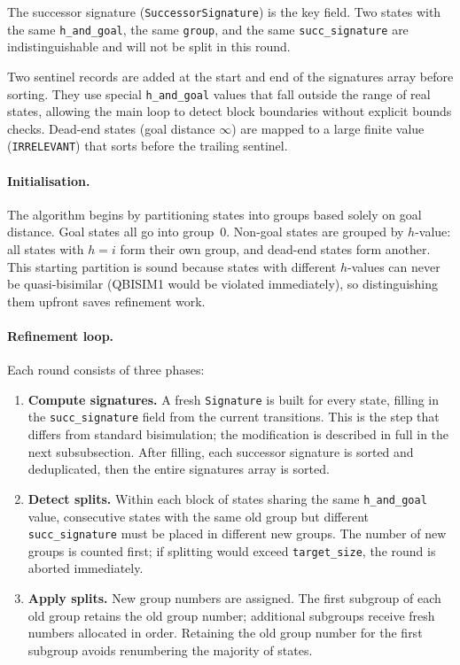 \documentclass[11pt,a4paper]{article}
\begin{document}
The successor signature (\texttt{SuccessorSignature}) is the key field.  Two
states with the same \texttt{h\_and\_goal}, the same \texttt{group}, and the
same \texttt{succ\_signature} are indistinguishable and will not be split in
this round.

Two sentinel records are added at the start and end of the signatures array
before sorting.  They use special \texttt{h\_and\_goal} values that fall
outside the range of real states, allowing the main loop to detect block
boundaries without explicit bounds checks.  Dead-end states (goal distance
$\infty$) are mapped to a large finite value (\texttt{IRRELEVANT}) that sorts
before the trailing sentinel.

\paragraph{Initialisation.}
The algorithm begins by partitioning states into groups based solely on goal
distance.  Goal states all go into group~0.  Non-goal states are grouped by
$h$-value: all states with $h = i$ form their own group, and dead-end states
form another.  This starting partition is sound because states with different
$h$-values can never be quasi-bisimilar (QBISIM1 would be violated immediately),
so distinguishing them upfront saves refinement work.

\paragraph{Refinement loop.}
Each round consists of three phases:
\begin{enumerate}
  \item \textbf{Compute signatures.}  A fresh \texttt{Signature} is built for
    every state, filling in the \texttt{succ\_signature} field from the
    current transitions.  This is the step that differs from standard
    bisimulation; the modification is described in full in the next
    subsubsection.  After filling, each successor signature is sorted and
    deduplicated, then the entire signatures array is sorted.

  \item \textbf{Detect splits.}  Within each block of states sharing the same
    \texttt{h\_and\_goal} value, consecutive states with the same old group
    but different \texttt{succ\_signature} must be placed in different new
    groups.  The number of new groups is counted first; if splitting would
    exceed \texttt{target\_size}, the round is aborted immediately.

  \item \textbf{Apply splits.}  New group numbers are assigned.  The first
    subgroup of each old group retains the old group number; additional
    subgroups receive fresh numbers allocated in order.  Retaining the old
    group number for the first subgroup avoids renumbering the majority of
    states.
\end{enumerate}
\end{document}
